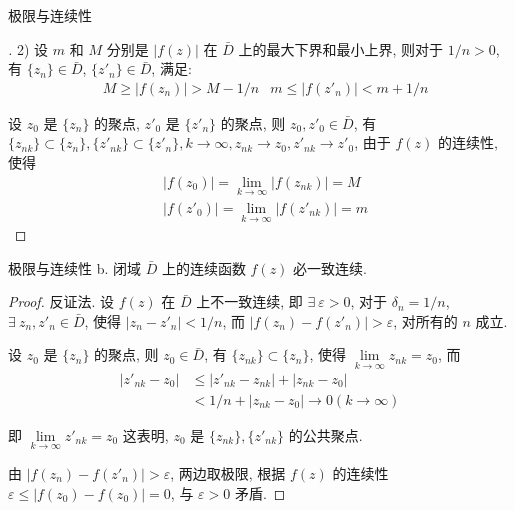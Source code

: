 \documentclass{beamer}
\begin{document}
\begin{frame}{极限与连续性}
\begin{proof}[]
2) 设 $ m $ 和 $ M $ 分别是 $ |f(z)| $ 在 $ \bar{D} $ 上的最大下界和最小上界, 则对于 $ 1/n>0 $, 有 $ \{z_n\} \in \bar{D} $,  $ \{z'_n\} \in \bar{D} $,  满足: 
\begin{align*}
&M \geq |f(z_n)| > M-1/n
&m \leq |f(z'_n)| < m+1/n
\end{align*}

设 $ z_0 $ 是 $ \{z_n\} $ 的聚点,  $ z'_0 $ 是 $ \{z'_n\} $ 的聚点, 则 $ z_0, z'_0 \in \bar{D} $,  有 $ \{z_{nk}\} \subset \{z_n\}, \{z'_{nk}\} \subset \{z'_n\}, k \to \infty, z_{nk} \to z_0, z'_{nk} \to z'_0 $,  由于 $ f(z) $ 的连续性, 使得 
\begin{align*}
&|f ( {z_0} ) | = \lim\limits_{{k} \to \infty } |f ( {z_{nk}} ) | = M\\
&|f ( z'_{0} ) | = \lim\limits_{{k} \to \infty } |f ( z'_{{nk}} ) | = {{m}}
\end{align*}
\end{proof}

\end{frame}

\begin{frame}{极限与连续性}
b. 闭域  $ \bar{D} $  上的连续函数 $ f(z) $ 必一致连续. 
\begin{proof}
反证法. 设 $ f(z) $ 在 $ \bar{D} $  上不一致连续, 即 $ \exists\: \varepsilon >0 $, 对于 $ \delta_n = 1/n $,  $ \exists\: z_n, z'_n \in \bar{D} $,  使得 $ |z_n - z'_n|< 1/n $,  而 $ |f(z_n) - f(z'_n) | > \varepsilon $, 对所有的 $ n $ 成立. 

设 $ z_0 $ 是 $ \{z_n\} $ 的聚点, 则 $ z_0 \in \bar{D} $, 有 $ \{z_{nk}\} \subset \{z_n\} $, 使得
$ \lim\limits_{k \to \infty } {z_{nk} = {z}_{0}} $,  而 
\begin{align*}
|z'_{nk}- z_0 |& \leq |z'_{nk}- z_{nk} | + |z_{nk} - z_0 |\\
&< 1/n + |z_{nk} - z_0 | \to 0 (k \to \infty)
\end{align*}

即 $ \lim\limits_{{k} \to \infty } z'_{nk}= {z}_{0} $ 
这表明,  $ z_0 $ 是 $ \{z_{nk}\}, \{z'_{nk}\} $ 的公共聚点. 

由 $ |f(z_n) - f(z'_{n}) |>\varepsilon $,  两边取极限, 根据 $ f(z) $ 的连续性 $ \varepsilon \leq |f(z_0) - f(z_0) |=0 $, 与 $ \varepsilon >0 $ 矛盾. 
\end{proof}

\end{frame}
\end{document}
